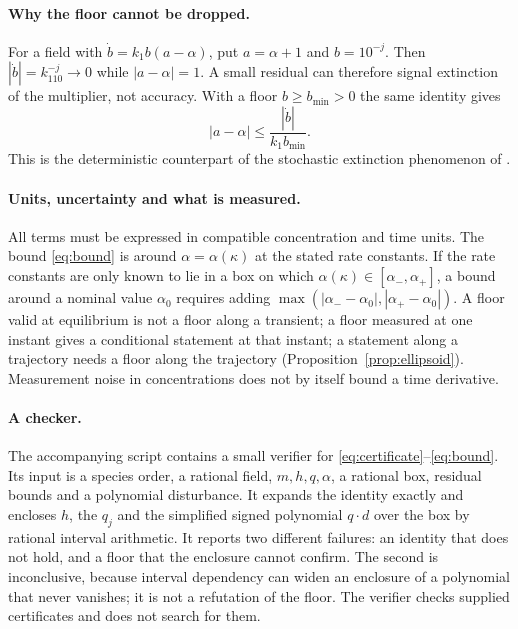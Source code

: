 \documentclass[11pt,a4paper]{article}
\theoremstyle{plain}
\theoremstyle{definition}
\theoremstyle{remark}
\begin{document}
\paragraph{Why the floor cannot be dropped.}
For a field with $\dot b=k_1b(a-\alpha)$, put $a=\alpha+1$ and $b=10^{-j}$. Then $|\dot b|=k_110^{-j}\to0$ while $|a-\alpha|=1$. A small residual can therefore signal extinction of the multiplier, not accuracy. With a floor $b\ge b_{\min}>0$ the same identity gives
\begin{equation}\label{eq:bfloor}
  |a-\alpha|\le\frac{|\dot b|}{k_1b_{\min}} .
\end{equation}
This is the deterministic counterpart of the stochastic extinction phenomenon of \cite{aej}.

\paragraph{Units, uncertainty and what is measured.}
All terms must be expressed in compatible concentration and time units. The bound \eqref{eq:bound} is around $\alpha=\alpha(\kappa)$ at the stated rate constants. If the rate constants are only known to lie in a box on which $\alpha(\kappa)\in[\alpha_-,\alpha_+]$, a bound around a nominal value $\alpha_0$ requires adding $\max(|\alpha_--\alpha_0|,|\alpha_+-\alpha_0|)$. A floor valid at equilibrium is not a floor along a transient; a floor measured at one instant gives a conditional statement at that instant; a statement along a trajectory needs a floor along the trajectory (Proposition~\ref{prop:ellipsoid}). Measurement noise in concentrations does not by itself bound a time derivative.

\paragraph{A checker.}
The accompanying script contains a small verifier for \eqref{eq:certificate}--\eqref{eq:bound}. Its input is a species order, a rational field, $m,h,q,\alpha$, a rational box, residual bounds and a polynomial disturbance. It expands the identity exactly and encloses $h$, the $q_j$ and the simplified signed polynomial $q\cdot d$ over the box by rational interval arithmetic. It reports two different failures: an identity that does not hold, and a floor that the enclosure cannot confirm. The second is inconclusive, because interval dependency can widen an enclosure of a polynomial that never vanishes; it is not a refutation of the floor. The verifier checks supplied certificates and does not search for them.
\end{document}

